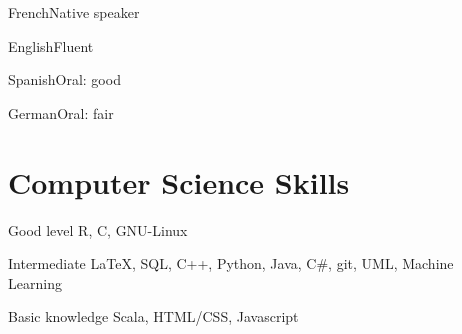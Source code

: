 \documentclass{tccv}
\begin{document}
\begin{factlist}
\item{French}{Native speaker}
\item{English}{Fluent}
\item{Spanish}{Oral: good}
\item{German}{Oral: fair}
\end{factlist}

\section{Computer Science Skills}

\begin{factlist}

\item{Good level}
     {R, C, GNU-Linux}
     
\item{Intermediate}
     {\LaTeX, SQL, C++, Python, Java, C\#, git, UML, Machine Learning}
     
\item{Basic knowledge}
     {Scala, HTML/CSS, Javascript}

\end{factlist}
\end{document}
